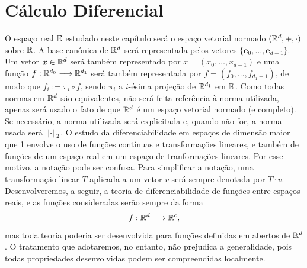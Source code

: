 \chapter{Cálculo Diferencial}

O espaço real $\mathbb{E}$ estudado neste capítulo será o espaço vetorial normado $(\mathbb{R}^d,+,\cdot)$ sobre $\mathbb{R}$. A base canônica de $\mathbb{R}^d$ será representada pelos vetores $\{\bm e_0, \ldots, \bm e_{d-1}\}$. Um vetor $x \in \mathbb{R}^d$ será também representado por $x=(x_0,\ldots,x_{d-1})$ e uma função $f: \mathbb{R}^{d_0} \longrightarrow \mathbb{R}^{d_1}$ será também representada por $f=(f_0,\ldots,f_{d_1-1})$, de modo que $f_i := \pi_i \circ f$, sendo $\pi_i$ a $i$-ésima projeção de $\mathbb{R}^{d_1}$ em $\mathbb{R}$. Como todas normas em $\mathbb{R}^d$ são equivalentes, não será feita referência à norma utilizada, apenas será usado o fato de que $\mathbb{R}^d$ é um espaço vetorial normado (e completo). Se necessário, a norma utilizada será explicitada e, quando não for, a norma usada será $\left\Vert{\cdot}\right\Vert_2$. O estudo da diferenciabilidade em espaços de dimensão maior que 1 envolve o uso de funções contínuas e transformações lineares, e também de funções de um espaço real em um espaço de tranformações lineares. Por esse motivo, a notação pode ser confusa. Para simplificar a notação, uma transformação linear $T$ aplicada a um vetor $v$ será sempre denotada por $T \cdot v$. Desenvolveremos, a seguir, a teoria de diferenciabilidade de funções entre espaços reais, e as funções consideradas serão sempre da forma
	\begin{equation*}
	f: \mathbb{R}^d \longrightarrow \mathbb{R}^c,
	\end{equation*}
mas toda teoria poderia ser desenvolvida para funções definidas em abertos de $\mathbb{R}^d$. O tratamento que adotaremos, no entanto, não prejudica a generalidade, pois todas propriedades desenvolvidas podem ser compreendidas localmente.


